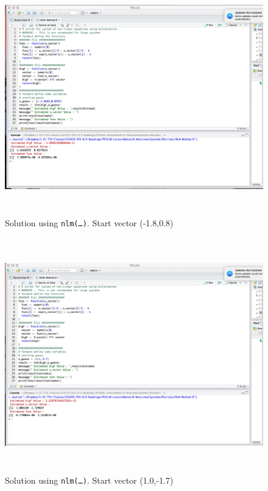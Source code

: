 \begin{figure}[h!] %
   \centering
   \includegraphics[height=4in]{./6-NonLinearSystems/NLM-Method-Works.jpg} 
   \caption{Solution using \texttt{nlm(\dots)}.  Start vector (-1.8,0.8)}
   \label{fig:NLM-Method-Works}
\end{figure}
\begin{figure}[h!] %
   \centering
   \includegraphics[height=4in]{./6-NonLinearSystems/NLM-Method-Works2.jpg} 
   \caption{Solution using \texttt{nlm(\dots)}.  Start vector (1.0,-1.7)}
   \label{fig:NLM-Method-Works2}
\end{figure}
\clearpage


